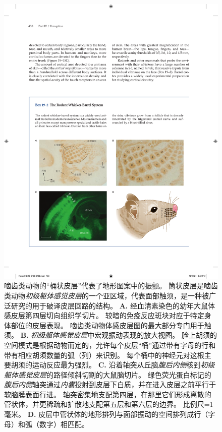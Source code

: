 \begin{figure}[htbp]
	\centering
	\includegraphics[width=1.0\linewidth]{chap19/fig_19_16}
	\caption{啮齿类动物的“桶状皮层”代表了地形图案中的振颤。
		筒状皮层是啮齿类动物\textit{初级躯体感觉皮层}的一个亚区域，代表面部触须，是一种被广泛研究的用于破译皮层回路的结构。
		\textbf{A.} 经血清素染色的幼年大鼠体感皮层第四层切向组织学切片。
		较暗的免疫反应斑块对应于特定身体部位的皮层表现。
		啮齿类动物体感皮层图的最大部分专门用于触须。
		\textbf{B.} \textit{初级躯体感觉皮层}中宏观振动表现的放大视图。
		脸上胡须的空间模式是根据动物而定的，允许每个皮层“桶”通过带有字母的行和带有相应胡须数量的弧（列）来识别。
		每个桶中的神经元对这根主要胡须的运动反应最为强烈。
		\textbf{C.} 沿着轴突从丘脑\textit{腹后内侧}核到\textit{初级躯体感觉皮层}的路径倾斜切割的大鼠脑切片。
		绿色荧光蛋白标记的\textit{腹后内侧}轴突通过\textit{内囊}投射到皮层下白质，并在进入皮层之前平行于软脑膜表面行进。
		轴突密集地支配第四层，在那里它们形成离散的管状体，并更稀疏和扩散地支配第五层和第六层的边界。
		比例尺=1 毫米。
		\textbf{D.} 皮层中管状体的地形排列与面部振动的空间排列成行（字母）和弧（数字）相匹配。}
	\label{fig:19_16}
\end{figure}



